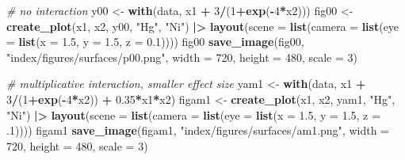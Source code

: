 \documentclass[12pt, twoside]{amherstthesis}
\newenvironment{Shaded}{\begin{snugshade}}{\end{snugshade}}
\newcommand{\AttributeTok}[1]{\textcolor[rgb]{0.13,0.29,0.53}{#1}}
\newcommand{\CommentTok}[1]{\textcolor[rgb]{0.56,0.35,0.01}{\textit{#1}}}
\newcommand{\DecValTok}[1]{\textcolor[rgb]{0.00,0.00,0.81}{#1}}
\newcommand{\FloatTok}[1]{\textcolor[rgb]{0.00,0.00,0.81}{#1}}
\newcommand{\FunctionTok}[1]{\textcolor[rgb]{0.13,0.29,0.53}{\textbf{#1}}}
\newcommand{\NormalTok}[1]{#1}
\newcommand{\OtherTok}[1]{\textcolor[rgb]{0.56,0.35,0.01}{#1}}
\newcommand{\SpecialCharTok}[1]{\textcolor[rgb]{0.81,0.36,0.00}{\textbf{#1}}}
\newcommand{\StringTok}[1]{\textcolor[rgb]{0.31,0.60,0.02}{#1}}
\begin{document}
\begin{Shaded}
\begin{Highlighting}[]
\CommentTok{\# no interaction}
\NormalTok{y00 }\OtherTok{\textless{}{-}} \FunctionTok{with}\NormalTok{(data, x1 }\SpecialCharTok{+} \DecValTok{3}\SpecialCharTok{/}\NormalTok{(}\DecValTok{1}\SpecialCharTok{+}\FunctionTok{exp}\NormalTok{(}\SpecialCharTok{{-}}\DecValTok{4}\SpecialCharTok{*}\NormalTok{x2))) }
\NormalTok{fig00 }\OtherTok{\textless{}{-}} \FunctionTok{create\_plot}\NormalTok{(x1, x2, y00, }\StringTok{"Hg"}\NormalTok{, }\StringTok{"Ni"}\NormalTok{)  }\SpecialCharTok{|\textgreater{}} 
  \FunctionTok{layout}\NormalTok{(}\AttributeTok{scene =} \FunctionTok{list}\NormalTok{(}\AttributeTok{camera =} \FunctionTok{list}\NormalTok{(}\AttributeTok{eye =} \FunctionTok{list}\NormalTok{(}\AttributeTok{x =} \FloatTok{1.5}\NormalTok{, }\AttributeTok{y =} \FloatTok{1.5}\NormalTok{, }\AttributeTok{z =} \FloatTok{0.1}\NormalTok{))))}
\NormalTok{fig00}
\FunctionTok{save\_image}\NormalTok{(fig00, }\StringTok{"index/figures/surfaces/p00.png"}\NormalTok{, }
           \AttributeTok{width =} \DecValTok{720}\NormalTok{, }\AttributeTok{height =} \DecValTok{480}\NormalTok{, }\AttributeTok{scale =} \DecValTok{3}\NormalTok{)}

\CommentTok{\# multiplicative interaction, smaller effect size}
\NormalTok{yam1 }\OtherTok{\textless{}{-}} \FunctionTok{with}\NormalTok{(data, x1 }\SpecialCharTok{+} \DecValTok{3}\SpecialCharTok{/}\NormalTok{(}\DecValTok{1}\SpecialCharTok{+}\FunctionTok{exp}\NormalTok{(}\SpecialCharTok{{-}}\DecValTok{4}\SpecialCharTok{*}\NormalTok{x2)) }\SpecialCharTok{+} \FloatTok{0.35}\SpecialCharTok{*}\NormalTok{x1}\SpecialCharTok{*}\NormalTok{x2) }
\NormalTok{figam1 }\OtherTok{\textless{}{-}} \FunctionTok{create\_plot}\NormalTok{(x1, x2, yam1, }\StringTok{"Hg"}\NormalTok{, }\StringTok{"Ni"}\NormalTok{) }\SpecialCharTok{|\textgreater{}} 
  \FunctionTok{layout}\NormalTok{(}\AttributeTok{scene =} \FunctionTok{list}\NormalTok{(}\AttributeTok{camera =} \FunctionTok{list}\NormalTok{(}\AttributeTok{eye =} \FunctionTok{list}\NormalTok{(}\AttributeTok{x =} \FloatTok{1.5}\NormalTok{, }\AttributeTok{y =} \FloatTok{1.5}\NormalTok{, }\AttributeTok{z =}\NormalTok{ .}\DecValTok{1}\NormalTok{))))}
\NormalTok{figam1}
\FunctionTok{save\_image}\NormalTok{(figam1, }\StringTok{"index/figures/surfaces/am1.png"}\NormalTok{, }
           \AttributeTok{width =} \DecValTok{720}\NormalTok{, }\AttributeTok{height =} \DecValTok{480}\NormalTok{, }\AttributeTok{scale =} \DecValTok{3}\NormalTok{)}


\end{Highlighting}
\end{Shaded}
\end{document}
